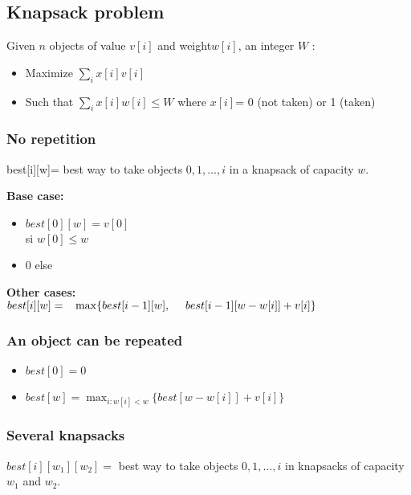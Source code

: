 \subsection{Knapsack problem}
Given $n$ objects of value $v[i]$ and weight$w[i]$, an integer $W$ :
\begin{itemize}
\item Maximize  $\sum_i x[i] v[i]$
\item Such that $\sum_i x[i] w[i] \leq W$ \hspace{15pt} where $ x[i] $= 0 (not taken) or 1 (taken)
\end{itemize}
\subsubsection{No repetition}
best[i][w]= best way to take objects $0, 1, \ldots, i$ in a knapsack of capacity $w$.

\begin{minipage}{0.25\textwidth}
\textbf{Base case:}
\begin{itemize}
\item $best[0][w] = v[0]$ \\si $w[0] \leq w$
\item 0 else
\end{itemize}
\end{minipage}
\begin{minipage}{0.25\textwidth}
\textbf{Other cases:}\\
$best[i][w]   = \\ \text{\ \ }\max \{ best[i-1][w], \\ \text{\ \ \ \ }best[i-1][w-w[i]] + v[i] \}$
\end{minipage}
\subsubsection{An object can be repeated}
\begin{itemize}
\item $ best[0] = 0$
\item $best[w] = \max_{i : w[i] < w} \{best[w - w[i]] + v[i]\}$
\end{itemize}

\subsubsection{Several knapsacks}

$best[i][w_1][w_2] =$ best way to take objects $0, 1, \ldots, i$ in knapsacks of capacity $w_1$ and $w_2$.